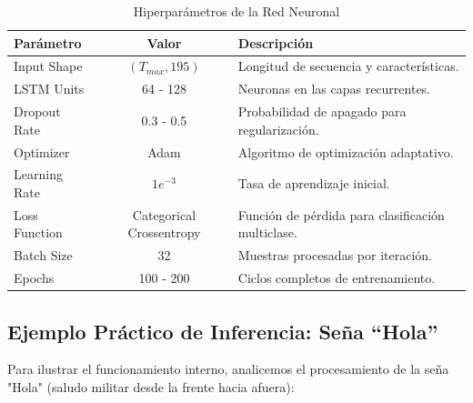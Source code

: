 \begin{table}[H]
    \centering
    \caption{Hiperparámetros de la Red Neuronal}
    \label{tab:hiperparametros}
    \begin{tabular}{|l|c|l|}
        \hline
        \textbf{Parámetro} & \textbf{Valor} & \textbf{Descripción} \\ \hline
        Input Shape & $(T_{max}, 195)$ & Longitud de secuencia y características. \\ \hline
        LSTM Units & 64 - 128 & Neuronas en las capas recurrentes. \\ \hline
        Dropout Rate & 0.3 - 0.5 & Probabilidad de apagado para regularización. \\ \hline
        Optimizer & Adam & Algoritmo de optimización adaptativo. \\ \hline
        Learning Rate & $1e^{-3}$ & Tasa de aprendizaje inicial. \\ \hline
        Loss Function & Categorical Crossentropy & Función de pérdida para clasificación multiclase. \\ \hline
        Batch Size & 32 & Muestras procesadas por iteración. \\ \hline
        Epochs & 100 - 200 & Ciclos completos de entrenamiento. \\ \hline
    \end{tabular}
\end{table}

\subsection{Ejemplo Práctico de Inferencia: Seña ``Hola''}

Para ilustrar el funcionamiento interno, analicemos el procesamiento de la seña "Hola" (saludo militar desde la frente hacia afuera):

